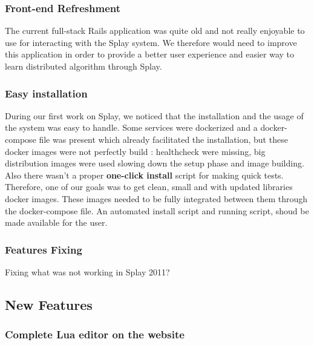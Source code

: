 \documentclass{eplmastersthesis}
\begin{document}
        \subsubsection{Front-end Refreshment}

          The current full-stack Rails application was quite old and not
          really enjoyable to use for interacting with the Splay system.
          We therefore would need to improve this application in order to
          provide a better user experience and easier way to learn distributed
          algorithm through Splay.

        \subsubsection{Easy installation}

          During our first work on Splay, we noticed that the installation and the
          usage  of the system was easy to handle. Some services were dockerized
          and a docker-compose file was present which already facilitated the
          installation, but these docker images were not perfectly build :
          healthcheck were missing, big distribution images were used slowing down
          the setup phase and image building.\\
          Also there wasn't a proper \textbf{one-click install} script for
          making quick tests.\\
          Therefore, one of our goals was to get clean, small and with updated
          libraries docker images. These images needed to be fully integrated
          between them through the docker-compose file. An automated install
          script and running script, shoud be made available for the user.

        \subsubsection{Features Fixing} %

          Fixing what was not working in Splay 2011?


      \subsection{New Features} %

        \subsubsection{Complete Lua editor on the website}
\end{document}
